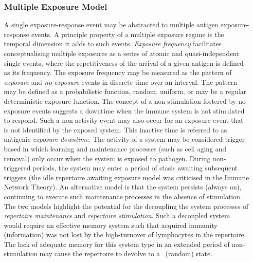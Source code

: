 \subsubsection{Multiple Exposure Model}
A single exposure-response event may be abstracted to multiple antigen exposure-response events. A principle property of a multiple exposure regime is the temporal dimension it adds to such events. \emph{Exposure frequency} facilitates conceptualising multiple exposures as a series of atomic and quasi-independent single events, where the repetitiveness of the arrival of a given antigen is defined as its frequency. The exposure frequency may be measured as the pattern of \emph{exposure} and \emph{no-exposure} events in discrete time over an interval. The pattern may be defined as a probabilistic function, random, uniform, or may be a regular deterministic exposure function.
The concept of a non-stimulation fostered by no-exposure events suggests a downtime when the immune system is not stimulated to respond. Such a non-activity event may also occur for an exposure event that is not identified by the exposed system. This inactive time is referred to as antigenic \emph{exposure downtime}. The activity of a system may be considered trigger-based in which learning and maintenance processes (such as cell aging and removal) only occur when the system is exposed to pathogen. During non-triggered periods, the system may enter a period of stasis awaiting subsequent triggers (the idle repertoire awaiting exposure model was criticised in the Immune Network Theory). An alternative model is that the system persists (always on), continuing to execute such maintenance processes in the absence of stimulation. The two models highlight the potential for the decoupling the system processes of \emph{repertoire maintenance} and \emph{repertoire stimulation}. Such a decoupled system would require an effective memory system such that acquired immunity (information) was not lost by the high-turnover of lymphocytes in the repertoire. The lack of adequate memory for this system type in an extended period of non-stimulation may cause the repertoire to devolve to a \naive\ (random) state. 

